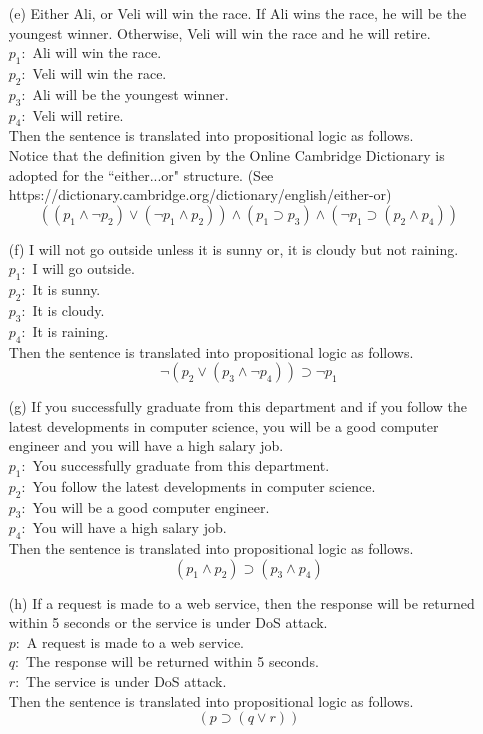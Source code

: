 \documentclass[12pt]{article}
\begin{document}
\begin{itemize}
	\item[(e)]
		Either Ali, or Veli will win the race. If Ali wins the race, he will be the youngest winner. Otherwise, Veli will win the race and he will retire. \\
		$p_1:$ Ali will win the race. \\
		$p_2:$ Veli will win the race. \\
		$p_3:$ Ali will be the youngest winner. \\
		$p_4:$ Veli will retire. \\
		Then the sentence is translated into propositional logic as follows. \\
                 Notice that the definition given by the Online Cambridge Dictionary is adopted for the ``either...or" structure. (See https://dictionary.cambridge.org/dictionary/english/either-or)
		\[
			((p_1 \land \neg p_2) \lor (\neg p_1 \land p_2)) \land (p_1 \supset p_3) \land (\neg p_1 \supset (p_2 \land p_4))
		\]
		
	\item[(f)]
		I will not go outside unless it is sunny or, it is cloudy but not raining. \\
		$p_1:$ I will go outside. \\
		$p_2:$ It is sunny. \\
		$p_3:$ It is cloudy. \\
		$p_4:$ It is raining. \\
		Then the sentence is translated into propositional logic as follows. \\
		\[
			\neg (p_2 \lor (p_3 \land \neg p_4)) \supset \neg p_1
		\]
		
	\item[(g)]
		If you successfully graduate from this department and if you follow the latest developments in computer science, you will be a good computer engineer and you will have a high salary job. \\
		$p_1:$ You successfully graduate from this department. \\
		$p_2:$ You follow the latest developments in computer science. \\
		$p_3:$ You will be a good computer engineer. \\
		$p_4:$ You will have a high salary job. \\
		Then the sentence is translated into propositional logic as follows. \\
		\[
			(p_1 \land p_2) \supset (p_3 \land p_4)
		\]
		
	\item[(h)]
		If a request is made to a web service, then the response will be returned within 5 seconds or the service is under DoS attack. \\
		$p:$ A request is made to a web service. \\
		$q:$ The response will be returned within 5 seconds. \\
		$r:$ The service is under DoS attack. \\
		Then the sentence is translated into propositional logic as follows. \\
		\[
			(p \supset (q \lor r))
		\]
		

\end{itemize}
\end{document}
